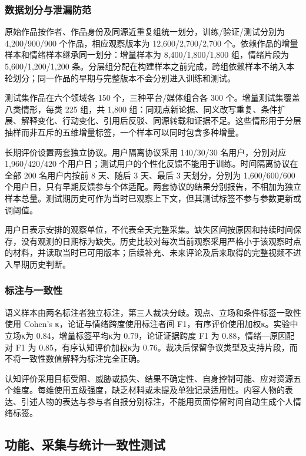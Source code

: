 \subsubsection{数据划分与泄漏防范}\label{section:3.3.2}

原始作品按作者、作品身份及同源近重复组统一划分，训练/验证/测试分别为 4,200/900/900 个作品，相应观察版本为 12,600/2,700/2,700 个。依赖作品的增量样本和情绪样本继承同一划分：增量样本为 8,400/1,800/1,800 组，情绪片段为 5,600/1,200/1,200 条。分层组分配在构建样本之前完成，跨组依赖样本不纳入本轮划分；同一作品的早期与完整版本不会分别进入训练和测试。

测试集作品在六个领域各 150 个，三种平台/媒体组合各 300 个。增量测试集覆盖八类情形，每类 225 组，共 1,800 组：同观点新论据、同义改写重复、条件扩展、解释变化、行动变化、引用后反驳、同源转载和证据不足。这些情形用于分层抽样而非互斥的五维增量标签，一个样本可以同时包含多种增量。

长期评价设置两套独立协议。用户隔离协议采用 140/30/30 名用户，分别对应 1,960/420/420 个用户日；测试用户的个性化反馈不能用于训练。时间隔离协议在全部 200 名用户内按前 8 天、随后 3 天、最后 3 天划分，分别为 1,600/600/600 个用户日，只有早期反馈参与个体适配。两套协议的结果分别报告，不相加为独立样本总量。测试期历史可作为当时已观察上下文，但其测试标签不参与参数更新或调阈值。

用户日表示安排的观察单位，不代表全天完整采集。缺失区间按原因和持续时间保存，没有观测的日期标为缺失。历史比较对每次当前观察采用严格小于该观察时点的材料，并读取当时已可用版本；后续补充、未来评论及后来取得的完整视频不进入早期历史判断。

\subsubsection{标注与一致性}\label{section:3.3.3}

语义样本由两名标注者独立标注，第三人裁决分歧。观点、立场和条件标签一致性使用 Cohen's κ，论证与情绪跨度使用标注者间 F1，有序评价使用加权κ。实验中立场κ为 0.84，增量标签平均κ为 0.79，论证证据跨度 F1 为 0.88，情绪---原因配对 F1 为 0.85，有序认知评价加权κ为 0.76。裁决后保留争议类型及支持片段，而不将一致性数值解释为标注完全正确。

认知评价采用目标受阻、威胁或损失、结果不确定性、自身控制可能、应对资源五个维度。每维使用五级强度，缺乏材料或未提及单独记录适用性。内容人物的表达、引述人物的表达与参与者自报分别标注，不能用页面停留时间自动生成个人情绪标签。

\subsection{功能、采集与统计一致性测试}\label{section:3.4}

